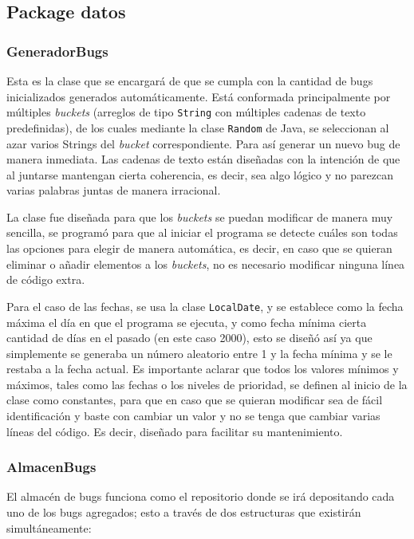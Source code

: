 \documentclass[12pt,letterpaper]{article}
\begin{document}
\subsection{Package datos}

\subsubsection*{GeneradorBugs}
Esta es la clase que se encargará de que se cumpla con la cantidad de bugs inicializados generados automáticamente. Está conformada principalmente por múltiples \emph{buckets} (arreglos de tipo \texttt{String} con múltiples cadenas de texto predefinidas), de los cuales mediante la clase \texttt{Random} de Java, se seleccionan al azar varios Strings del \emph{bucket} correspondiente. Para así generar un nuevo bug de manera inmediata. Las cadenas de texto están diseñadas con la intención de que al juntarse mantengan cierta coherencia, es decir, sea algo lógico y no parezcan varias palabras juntas de manera irracional.

La clase fue diseñada para que los \emph{buckets} se puedan modificar de manera muy sencilla, se programó para que al iniciar el programa se detecte cuáles son todas las opciones para elegir de manera automática, es decir, en caso que se quieran eliminar o añadir elementos a los \emph{buckets}, no es necesario modificar ninguna línea de código extra.

Para el caso de las fechas, se usa la clase \texttt{LocalDate}, y se establece como la fecha máxima el día en que el programa se ejecuta, y como fecha mínima cierta cantidad de días en el pasado (en este caso 2000), esto se diseñó así ya que simplemente se generaba un número aleatorio entre 1 y la fecha mínima y se le restaba a la fecha actual. Es importante aclarar que todos los valores mínimos y máximos, tales como las fechas o los niveles de prioridad, se definen al inicio de la clase como constantes, para que en caso que se quieran modificar sea de fácil identificación y baste con cambiar un valor y no se tenga que cambiar varias líneas del código. Es decir, diseñado para facilitar su mantenimiento.

\subsubsection*{AlmacenBugs}
El almacén de bugs funciona como el repositorio donde se irá depositando cada uno de los bugs agregados; esto a través de dos estructuras que existirán simultáneamente:
\end{document}
